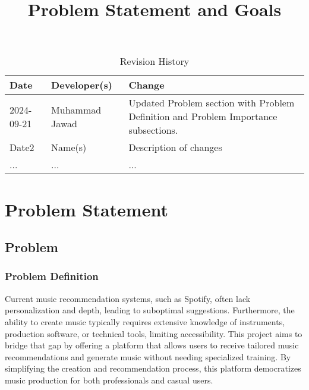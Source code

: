 \documentclass{article}
\title{Problem Statement and Goals\\\progname}
\author{\authname}
\date{}
\begin{document}
\maketitle

\begin{table}[hp]
\caption{Revision History} \label{TblRevisionHistory}
\begin{tabularx}{\textwidth}{llX}
\toprule
\textbf{Date} & \textbf{Developer(s)} & \textbf{Change}\\
\midrule
2024-09-21 & Muhammad Jawad & Updated Problem section with Problem Definition and Problem Importance subsections.\\
Date2 & Name(s) & Description of changes\\
... & ... & ...\\
\bottomrule
\end{tabularx}
\end{table}

\section{Problem Statement}



\subsection{Problem}

\subsubsection{Problem Definition}

Current music recommendation systems, such as Spotify, often lack personalization and depth, leading to suboptimal suggestions. Furthermore, the ability to create music typically requires extensive knowledge of instruments, production software, or technical tools, limiting accessibility. This project aims to bridge that gap by offering a platform that allows users to receive tailored music recommendations and generate music without needing specialized training. By simplifying the creation and recommendation process, this platform democratizes music production for both professionals and casual users.
\end{document}
